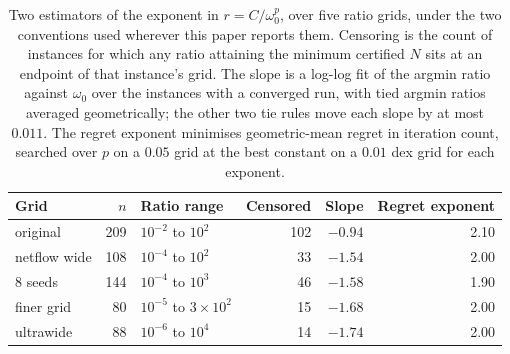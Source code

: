 \begin{table}[t]
\centering
\caption{Two estimators of the exponent in $r = C / \omega_0^p$, over five
ratio grids, under the two conventions used wherever this paper reports them.
Censoring is the count of instances for which any ratio attaining the minimum
certified $N$ sits at an endpoint of that instance's grid. The slope is a
log-log fit of the argmin ratio against $\omega_0$ over the instances with a
converged run, with tied argmin ratios averaged geometrically; the other two tie
rules move each slope by at most $0.011$. The regret exponent minimises
geometric-mean regret in iteration count, searched over $p$ on a $0.05$ grid at
the best constant on a $0.01$ dex grid for each exponent.}
\label{tab:exponent}
\begin{tabular}{@{}lrlrrr@{}}
\toprule
Grid & $n$ & Ratio range & Censored & Slope & Regret exponent \\
\midrule
original    & 209 & $10^{-2}$ to $10^{2}$  & 102 & $-0.94$ & 2.10 \\
netflow wide & 108 & $10^{-4}$ to $10^{2}$ & 33 & $-1.54$ & 2.00 \\
8 seeds     & 144 & $10^{-4}$ to $10^{3}$  & 46 & $-1.58$ & 1.90 \\
finer grid  &  80 & $10^{-5}$ to $3 \times 10^{2}$ & 15 & $-1.68$ & 2.00 \\
ultrawide   &  88 & $10^{-6}$ to $10^{4}$  & 14 & $-1.74$ & 2.00 \\
\bottomrule
\end{tabular}
\end{table}

